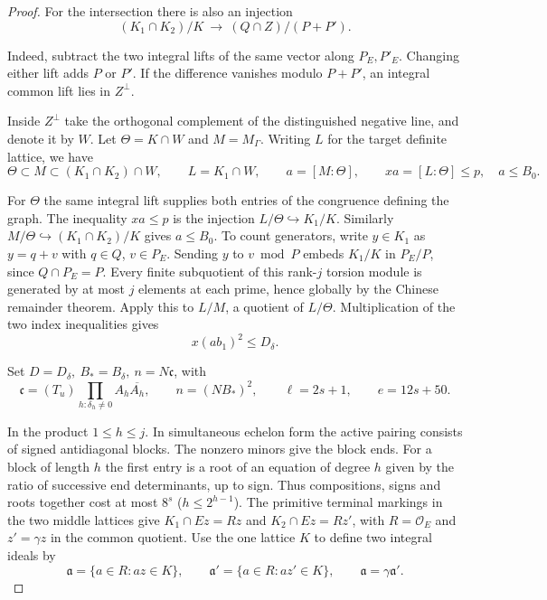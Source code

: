 \begin{proof}
For the intersection there is also an injection
\[
 (K_1\cap K_2)/K\ \longrightarrow\ (Q\cap Z)/(P+P').
\]

Indeed, subtract the two integral lifts of the same vector along
\(P_E,P'_E\). Changing either lift adds \(P\) or \(P'\). If the
difference vanishes modulo \(P+P'\), an integral common lift
lies in \(Z^\perp\).

Inside \(Z^\perp\) take the orthogonal complement of the
distinguished negative line, and denote it by \(W\).
Let \(\Theta=K\cap W\) and \(M=M_\Gamma\). Writing \(L\)
for the target definite lattice, we have
\[
 \Theta\subset M\subset (K_1\cap K_2)\cap W,\qquad L=K_1\cap W,\qquad
 a=[M:\Theta],\qquad xa=[L:\Theta]\le p,\quad a\le B_0 .
\]

For \(\Theta\) the same integral lift supplies both entries of
the congruence defining the graph. The inequality \(xa\le p\) is
the injection \(L/\Theta\hookrightarrow K_1/K\). Similarly
\(M/\Theta\hookrightarrow(K_1\cap K_2)/K\) gives \(a\le B_0\).
To count generators, write \(y\in K_1\) as \(y=q+v\) with
\(q\in Q\), \(v\in P_E\). Sending \(y\) to \(v\bmod P\)
embeds \(K_1/K\) in \(P_E/P\), since \(Q\cap P_E=P\).
Every finite subquotient of this rank-\(j\) torsion module is
generated by at most \(j\) elements at each prime, hence globally
by the Chinese remainder theorem. Apply this to \(L/M\), a
quotient of \(L/\Theta\). Multiplication of the two index inequalities gives
\begin{equation}\label{eq:zero-gram-effective-index}
                    x(a b_1)^2\le D_\delta .
\end{equation}

Set \(D=D_\delta,\ B_*=B_\delta,\ n=N\mathfrak c\), with
\[
 \mathfrak c=(T_u)\prod_{h:\delta_h\ne0} A_h\overline {A_h},
 \qquad n=(NB_*)^2,\qquad \ell=2s+1,\qquad e=12s+50 .
\]

In the product \(1\le h\le j\). In simultaneous echelon form
the active pairing consists of signed antidiagonal blocks.
The nonzero minors give the block ends. For a block of length
\(h\) the first entry is a root of an equation of degree \(h\)
given by the ratio of successive end determinants, up to sign.
Thus compositions, signs and roots together cost at most \(8^s\)
(\(h\le2^{h-1}\)). The primitive terminal markings in the two middle
lattices give \(K_1\cap Ez=Rz\) and \(K_2\cap Ez=Rz'\), with
\(R=\mathcal O_E\) and \(z'=\gamma z\) in the common quotient.
Use the one lattice \(K\) to define two integral ideals by
\[
 \mathfrak a=\{a\in R:az\in K\},\qquad
 \mathfrak a'=\{a\in R:az'\in K\},\qquad
                   \mathfrak a=\gamma\mathfrak a'.
\]


\end{proof}
